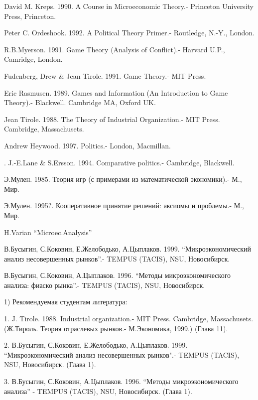 \documentclass[a4paper,12pt]{article}
\begin{document}
\begin{thebibliography}{99}

 David M. Kreps. 1990.  A Course in Microeconomic Theory.- Princeton University Press,   
Princeton.

 Peter C. Ordeshook. 1992. A Political Theory Primer.- Routledge, N.-Y., London.

 R.B.Myerson. 1991. Game Theory (Analysis of Conflict).- Harvard U.P., Camridge, 
London.

  Fudenberg, Drew \& Jean Tirole. 1991. Game Theory.- MIT Press.

  Eric Rasmusen. 1989. Games and Information (An
Introduction to Game Theory).-  Blackwell. Cambridge MA, Oxford UK.

  Jean Tirole. 1988. The Theory of Industrial Organization.-
 MIT Press.   Cambridge, Massachusets.

 Andrew Heywood. 1997. Politics.- London, Macmillan.

. J.-E.Lane \& S.Ersson. 1994.
 Comparative politics.- Cambridge, Blackwell.

 Э.Мулен. 1985.  Теория игр  (с примерами из математической
экономики).- М., Мир.

 Э.Мулен. 1995?. Кооперативное принятие решений:
 аксиомы и проблемы.- М., Мир.

 H.Varian ``Microec.Analysis''

 В.Бусыгин, С.Коковин, Е.Желободько, А.Цыплаков.
1999. ``Микроэкономический анализ несовершенных
рынков''.- TEMPUS (TACIS), NSU, Новосибирск.

 В.Бусыгин, С.Коковин,  А.Цыплаков. 1996.
 ``Методы микроэкономического анализа: фиаско рынка''.- TEMPUS (TACIS),
 NSU, Новосибирск.

\end{thebibliography}

1) Рекомендуемая студентам литература:

1. J. Tirole. 1988. Industrial organization.- MIT
Press. Cambridge, Massachusets. (Ж.Тироль. Теория
отраслевых рынков.- М.Экономика, 1999.) (Глава 11).

2. В.Бусыгин, С.Коковин, Е.Желободько, А.Цыплаков.
1999. ``Микроэкономический анализ несовершенных
рынков".- TEMPUS (TACIS), NSU, Новосибирск. (Глава 1).

3. В.Бусыгин, С.Коковин, А.Цыплаков. 1996. ``Методы
микроэкономического анализа'' - TEMPUS (TACIS), NSU, Новосибирск. (Глава 1).
\end{document}
